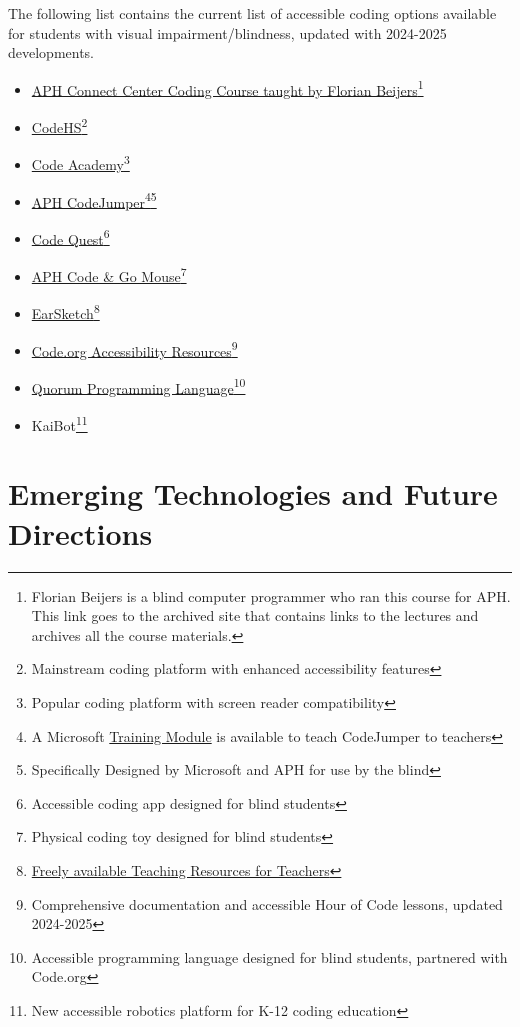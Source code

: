 The following list contains the current list of accessible coding options available for students with visual impairment/blindness, updated with 2024-2025 developments.
\begin{itemize}
 \item \href{https://zersiax.github.io/}{APH Connect Center Coding Course taught by Florian Beijers}\footnote{\raggedright Florian Beijers is a blind computer programmer who ran this course for APH. This link goes to the archived site that contains links to the lectures and archives all the course materials.}
 \item \href{https://codehs.com/}{CodeHS}\footnote{\raggedright Mainstream coding platform with enhanced accessibility features}
 \item \href{https://www.codecademy.com/}{Code Academy}\footnote{\raggedright Popular coding platform with screen reader compatibility}
 \item \href{https://codejumper.com/}{APH CodeJumper}\footnote{\raggedright A Microsoft \href{https://docs.microsoft.com/en-us/learn/modules/code-jumper-inclusive-physical-coding-language/}{Training Module} is available to teach CodeJumper to teachers}\footnote{\raggedright Specifically Designed by Microsoft and APH for use by the blind}
 \item \href{https://www.aph.org/product/code-quest-for-ipad-iphone/}{Code Quest}\footnote{\raggedright Accessible coding app designed for blind students}
 \item \href{https://www.aph.org/product/accessible-code-and-go-mouse/}{APH Code \& Go Mouse}\footnote{\raggedright Physical coding toy designed for blind students}
 \item \href{https://earsketch.gatech.edu/landing/}{EarSketch}\footnote{\raggedright \href{https://www.teachers.earsketch.org/learn}{Freely available Teaching Resources for Teachers}}
 \item \href{https://code.org/accessibility}{Code.org Accessibility Resources}\footnote{\raggedright Comprehensive documentation and accessible Hour of Code lessons, updated 2024-2025}
 \item \href{https://quorumlanguage.com/}{Quorum Programming Language}\footnote{\raggedright Accessible programming language designed for blind students, partnered with Code.org}
 \item KaiBot\footnote{\raggedright New accessible robotics platform for K-12 coding education}
\end{itemize}

\section{Emerging Technologies and Future Directions}\label{appx12}

